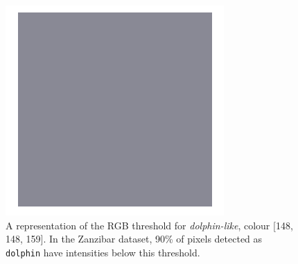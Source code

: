 \begin{figure}
	\begin{center}
		\includegraphics[scale=0.3]{Chapter3/figs/148-148-159.png}
	\end{center}
	\caption[A representation of the RGB threshold for \textit{dolphin-like}, colour \[148, 148, 159\].]{A representation of the RGB threshold for \textit{dolphin-like}, colour [148, 148, 159]. In the Zanzibar dataset, 90\% of pixels detected as \texttt{dolphin} have intensities below this threshold.}\label{fig:colour-threshold}
\end{figure}

